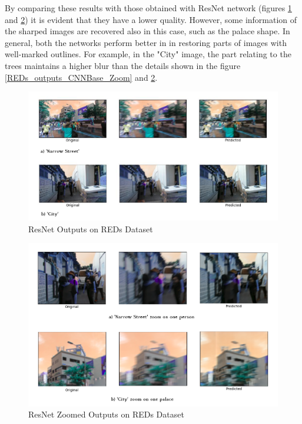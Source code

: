 \documentclass[12pt,a4paper]{report}
\begin{document}
 
By comparing these results with those obtained with ResNet network (figures \ref{REDs_ResNet_Outputs} and \ref{REDs_ResNet_Outputs_Zoom}) it is evident that they have a lower quality. However, some information of the sharped images are recovered also in this case, such as the palace shape. In general, both the networks perform better in in restoring parts of images with well-marked outlines. For example, in the "City" image, the part relating to the trees maintains a higher blur than the details shown in the figure \ref{REDs_outputs_CNNBase_Zoom} and \ref{REDs_ResNet_Outputs_Zoom}.


\begin{figure}[hptb]
\centering
\includegraphics[scale=0.5]{REDs_ResNet_Outputs.png} 
\caption{ResNet Outputs on REDs Dataset}
\label{REDs_ResNet_Outputs}
\end{figure}

\begin{figure}[hptb]
\centering
\includegraphics[scale=0.35]{REDs_ResNet_Outputs_Zoom.png} 
\caption{ResNet Zoomed Outputs on REDs Dataset}
\label{REDs_ResNet_Outputs_Zoom}
\end{figure}
\end{document}

